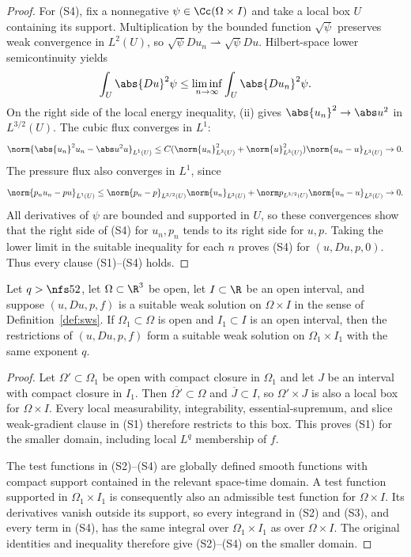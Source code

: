 \documentclass[11pt,reqno]{amsart}
\begin{document}
\begin{proof}
For (S4), fix a nonnegative $\psi\in\Cc(\Omega\times I)$ and take a local
box $U$ containing its support. Multiplication by the bounded function
$\sqrt\psi$ preserves weak convergence in $L^2(U)$, so
$\sqrt\psi Du_n\rightharpoonup\sqrt\psi Du$. Hilbert-space lower
semicontinuity yields
\[
 \int_U\abs{Du}^2\psi\leq\liminf_{n\to\infty}
                         \int_U\abs{Du_n}^2\psi.
\]
On the right side of the local energy inequality, (ii) gives
$\abs{u_n}^2\to\abs u^2$ in $L^{3/2}(U)$. The cubic flux converges in $L^1$:
\[
 \norm{\abs{u_n}^2u_n-\abs u^2u}_{L^1(U)}
 \leq C(\norm{u_n}_{L^3(U)}^2+\norm{u}_{L^3(U)}^2)
                   \norm{u_n-u}_{L^3(U)}\to0.
\]
The pressure flux also converges in $L^1$, since
\[
 \norm{p_nu_n-pu}_{L^1(U)}
 \leq\norm{p_n-p}_{L^{3/2}(U)}\norm{u_n}_{L^3(U)}
      +\norm p_{L^{3/2}(U)}\norm{u_n-u}_{L^3(U)}\to0.
\]
All derivatives of $\psi$ are bounded and supported in $U$, so these
convergences show that the right side of (S4) for $u_n,p_n$ tends to its
right side for $u,p$. Taking the lower limit in the suitable inequality for
each $n$ proves (S4) for $(u,Du,p,0)$. Thus every clause (S1)--(S4) holds.
\end{proof}

\begin{lemma}\label{lem:sws-restrict}
Let $q>\nfs52$, let $\Omega\subset\R^3$ be open, let $I\subset\R$ be an open
interval, and suppose $(u,Du,p,f)$ is a suitable weak solution on
$\Omega\times I$ in the sense of Definition~\ref{def:sws}. If
$\Omega_1\subset\Omega$ is open and $I_1\subset I$ is an open interval,
then the restrictions of $(u,Du,p,f)$ form a suitable weak solution on
$\Omega_1\times I_1$ with the same exponent $q$.
\end{lemma}

\begin{proof}
Let $\Omega'\subset\Omega_1$ be open with compact closure in $\Omega_1$ and
let $J$ be an interval with compact closure in $I_1$. Then
$\overline{\Omega'}\subset\Omega$ and $\overline J\subset I$, so
$\Omega'\times J$ is also a local box for $\Omega\times I$. Every local
measurability, integrability, essential-supremum, and slice weak-gradient
clause in (S1) therefore restricts to this box. This proves (S1) for the
smaller domain, including local $L^q$ membership of $f$.

The test functions in (S2)--(S4) are globally defined smooth functions with
compact support contained in the relevant space-time domain. A test function
supported in $\Omega_1\times I_1$ is consequently also an admissible test
function for $\Omega\times I$. Its derivatives vanish outside its support,
so every integrand in (S2) and (S3), and every term in (S4), has the same
integral over $\Omega_1\times I_1$ as over $\Omega\times I$. The original
identities and inequality therefore give (S2)--(S4) on the smaller domain.
\end{proof}
\end{document}
